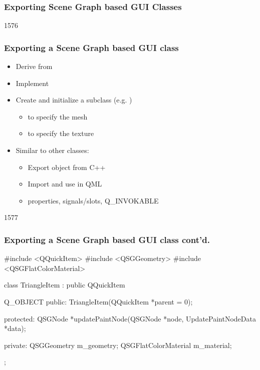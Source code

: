 
\subsubsection{Exporting Scene Graph based GUI Classes}

\begin{slide}{1576}\frametitle{Exporting a Scene Graph based GUI class}
  \begin{itemize}
  \item Derive from 
  \item Implement 
  \item Create and initialize a  subclass (e.g. )
    \begin{itemize}
    \item {} to specify the mesh
    \item {} to specify the texture
    \end{itemize}
  \item Similar to other classes:
    \begin{itemize}
    \item Export object from C++
    \item Import and use in QML
    \item properties, signals/slots, Q\_INVOKABLE
    \end{itemize}
  \end{itemize}
\end{slide}

\begin{slide}[fragile]{1577}\frametitle{Exporting a Scene Graph based GUI class cont'd.}

\begin{cpp}
#include <QQuickItem>
#include <QSGGeometry>
#include <QSGFlatColorMaterial>

class TriangleItem : public QQuickItem
{
    Q_OBJECT
public:
    TriangleItem(QQuickItem *parent = 0);

protected:
    QSGNode *updatePaintNode(QSGNode *node, UpdatePaintNodeData *data);

private:
    QSGGeometry m_geometry;
    QSGFlatColorMaterial m_material;
};
\end{cpp}
\end{slide}

